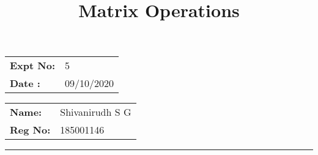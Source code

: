 \documentclass[12pt,a4paper]{article}
\title{\bf Matrix Operations}
\author{\vspace{-10ex}}
\date{\vspace{-10ex}}
\begin{document}
\maketitle

\begin{minipage}{0.45\textwidth}
        \begin{tabular}{l l}
            \textbf{Expt No:}&5\\
            \textbf{Date :}&09/10/2020
        \end{tabular}
\end{minipage}%
\begin{minipage}{0.45\textwidth}
        \begin{tabular}{l l}
             \textbf{Name:}& Shivanirudh S G  \\
             \textbf{Reg No:} & 185001146 
        \end{tabular}
\end{minipage}
\vspace{1cm}
\hrule
\end{document}

